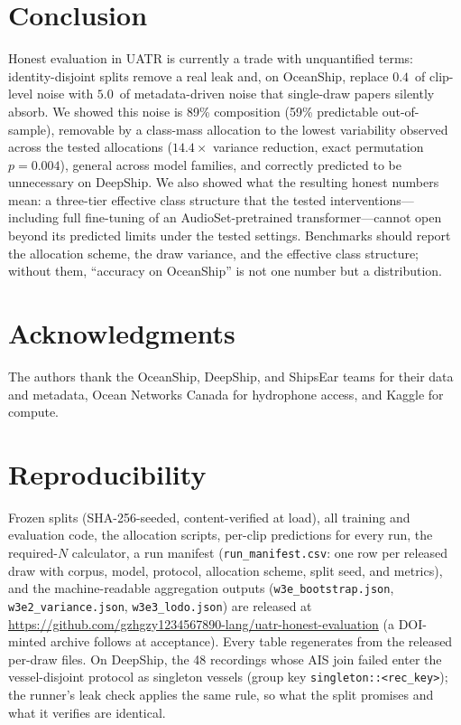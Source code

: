 ﻿\documentclass[journal]{IEEEtran}
\newcommand{\pp}{\,\text{pp}}
\begin{document}
\section{Conclusion}
Honest evaluation in UATR is currently a trade with unquantified terms: identity-disjoint splits
remove a real leak and, on OceanShip, replace $0.4$\pp{} of clip-level noise with $5.0$\pp{} of
metadata-driven noise that single-draw papers silently absorb. We showed this noise is 89\%
composition (59\% predictable out-of-sample), removable by a class-mass allocation to the lowest
variability observed across the tested allocations
($14.4\times$ variance reduction, exact permutation $p=0.004$), general across model families, and correctly
predicted to be unnecessary on DeepShip. We also showed what the resulting honest numbers mean: a
three-tier effective class structure that the tested interventions---including full fine-tuning of an
AudioSet-pretrained transformer---cannot open beyond its predicted limits under the tested
settings. Benchmarks should report
the allocation scheme, the draw variance, and the effective class structure; without them,
``accuracy on OceanShip'' is not one number but a distribution.

\section*{Acknowledgments}
The authors thank the OceanShip, DeepShip, and ShipsEar teams for their data and metadata, Ocean
Networks Canada for hydrophone access, and Kaggle for compute.

\section*{Reproducibility}
Frozen splits (SHA-256-seeded, content-verified at load), all training and evaluation code, the
allocation scripts, per-clip predictions for every run, the required-$N$ calculator, a run
manifest (\texttt{run\_manifest.csv}: one row per released draw with corpus, model, protocol,
allocation scheme, split seed, and metrics), and the machine-readable aggregation outputs
(\texttt{w3e\_bootstrap.json}, \texttt{w3e2\_variance.json}, \texttt{w3e3\_lodo.json}) are
released at \url{https://github.com/gzhgzy1234567890-lang/uatr-honest-evaluation} (a DOI-minted
archive follows at acceptance). Every table
regenerates from the released per-draw
files. On DeepShip, the 48 recordings whose AIS join failed enter the vessel-disjoint protocol as
singleton vessels (group key \texttt{singleton::<rec\_key>}); the runner's leak check applies the
same rule, so what the split promises and what it verifies are identical.
\end{document}
